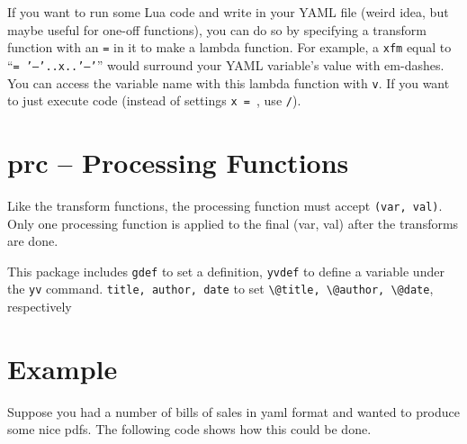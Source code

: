 \documentclass[11pt,parskip=half]{scrartcl}
\begin{document}
If you want to run some Lua code and write in your YAML file (weird idea, but maybe useful for one-off functions),
you can do so by specifying a transform function with an \texttt{=} in it to make a lambda function.
For example, a \texttt{xfm} equal to
``\texttt{= '---'..x..'---'}''
would surround your YAML variable's value with em-dashes.
You can access the variable name with this lambda function with \texttt{v}.
If you want to just execute code (instead of settings \texttt{x = }, use \texttt{/}).

  \section{prc -- Processing Functions}
Like the transform functions, the processing function must accept \texttt{(var, val)}.
Only one processing function is applied to the final (var, val) after the transforms are done.

This package includes \texttt{gdef} to set a definition, \texttt{yvdef} to define a variable under the \texttt{yv} command.
\texttt{title, author, date} to set \texttt{\textbackslash @title, \textbackslash @author, \textbackslash @date},
respectively

    \section{Example}\label{example}

    Suppose you had a number of bills of sales in yaml format and wanted to produce some nice pdfs.
    The following code shows how this could be done.

    \pagebreak
    \vspace*{-5em}
\end{document}

